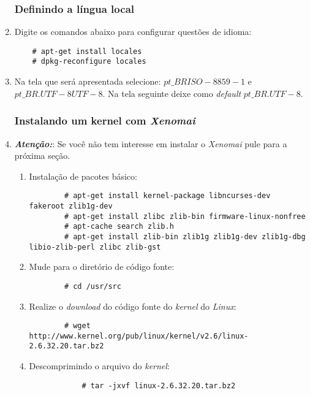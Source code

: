 \documentclass[a4paper,10pt]{article}
\begin{document}
\begin{enumerate}
    \subsubsection{Definindo a língua local}
    \item Digite os comandos abaixo para configurar questões de idioma:
      \begin{lstlisting}
	# apt-get install locales
	# dpkg-reconfigure locales
      \end{lstlisting}
    \item Na tela que será apresentada selecione: $pt\_BR ISO-8859-1$ e $pt\_BR.UTF-8 UTF-8$. Na tela 
	seguinte deixe como \emph{default} $pt\_BR.UTF-8$. 

    \subsubsection{Instalando um kernel com \emph{Xenomai}}
    \item \textbf{\emph{Atenção:}}: Se você não tem interesse em instalar o \emph{Xenomai} pule para a próxima seção. 
    \begin{enumerate}
	\item Instalação de pacotes básico:
	  \begin{lstlisting}
	    # apt-get install kernel-package libncurses-dev fakeroot zlib1g-dev
	    # apt-get install zlibc zlib-bin firmware-linux-nonfree
	    # apt-cache search zlib.h
	    # apt-get install zlib-bin zlib1g zlib1g-dev zlib1g-dbg libio-zlib-perl zlibc zlib-gst	
	  \end{lstlisting}

	\item Mude para o diretório de código fonte:
	  \begin{lstlisting}
	    # cd /usr/src 
	  \end{lstlisting}

	\item Realize o \emph{download} do código fonte do \emph{kernel} do \emph{Linux}:
	  \begin{lstlisting}
	    # wget http://www.kernel.org/pub/linux/kernel/v2.6/linux-2.6.32.20.tar.bz2
	  \end{lstlisting}

	\item Descomprimindo o arquivo do \emph{kernel}:
	  \begin{lstlisting}
    	    # tar -jxvf linux-2.6.32.20.tar.bz2
	  \end{lstlisting}


\end{enumerate}
\end{enumerate}
\end{document}
